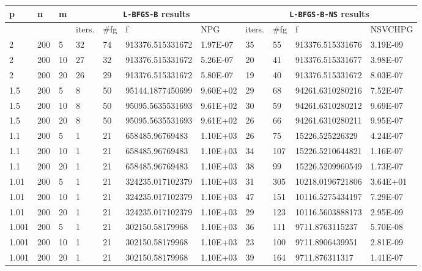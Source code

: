 \begin{table}
  \tiny
  \begin{center}
    \begin{tabular}{|l|l|l|l|l|l|l|l|l|l|l|}
      \hline
      p & n & m  & \multicolumn{4}{|c|}{\texttt{L-BFGS-B} results} & \multicolumn{4}{|c|}{\texttt{L-BFGS-B-NS} results} \\ \hline
      &  & & iters. & \#fg & f & NPG & iters. & \#fg & f & NSVCHPG \\ \hline
      2 & 200 & 5 & 32 & 74 & 913376.515331672 & 1.97E-07 & 35 & 55 & 913376.515331676 & 3.19E-09\\
      2 & 200 & 10  & 27 & 32 & 913376.515331672 & 5.26E-07 & 20 & 41 & 913376.515331677 & 3.98E-07\\
      2 & 200 & 20 & 26 & 29 & 913376.515331672 & 5.80E-07 & 19 & 40 & 913376.515331672 & 8.03E-07\\
      1.5 & 200 & 5 &  8 & 50 & 95144.1877450699 & 9.60E+02 & 29 & 68 & 94261.6310280216 & 7.52E-07\\
      1.5 & 200 & 10 &  8 & 50 & 95095.5635531693 & 9.61E+02 & 30 & 59 & 94261.6310280212 & 9.69E-07\\
      1.5 & 200 & 20 &   8 & 50 & 95095.5635531693 & 9.61E+02 & 26 & 66 & 94261.6310280211 & 9.95E-07\\
      1.1 & 200 & 5 &  1 & 21 & 658485.96769483 & 1.10E+03 & 26 & 75 & 15226.525226329 & 4.24E-07\\
      1.1 & 200 & 10 &  1 & 21 & 658485.96769483 & 1.10E+03 & 34 & 107 & 15226.5210644821 & 1.16E-07\\
      1.1 & 200 & 20 &  1 & 21 & 658485.96769483 & 1.10E+03 & 38 & 99 & 15226.5209960549 & 1.73E-07\\
      1.01 & 200 & 5 &  1 & 21 & 324235.017102379 & 1.10E+03 & 31 & 305 & 10218.0196721806 & 3.64E+01\\
      1.01 & 200 & 10 &  1 & 21 & 324235.017102379 & 1.10E+03 & 47 & 151 & 10116.5275434197 & 7.29E-07\\
      1.01 & 200 & 20 &  1 & 21 & 324235.017102379 & 1.10E+03 & 29 & 123 & 10116.5603888173 & 2.95E-09\\
      1.001 & 200 & 5 &  1 & 21 & 302150.58179968 & 1.10E+03 & 36 & 111 & 9711.8763115237 & 5.70E-08\\
      1.001 & 200 & 10 &  1 & 21 & 302150.58179968 & 1.10E+03 & 23 & 100 & 9711.8906439951 & 2.81E-09\\
      1.001 & 200 & 20 &  1 & 21 & 302150.58179968 & 1.10E+03 & 39 & 164 & 9711.876311317 & 1.41E-07\\

\end{tabular}
\end{center}
\end{table}
